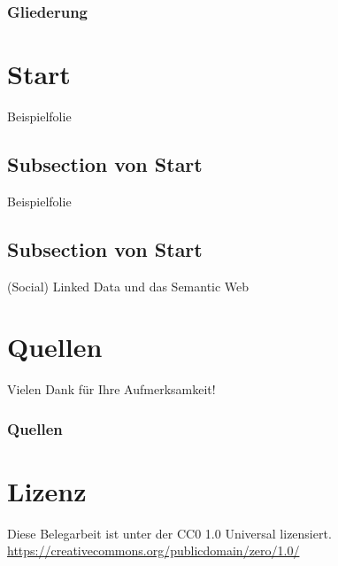 \documentclass{beamer}              %
\begin{document}
\begin{frame}	
	\frametitle{Gliederung}
	\tableofcontents
\end{frame}

\section{Start}
\begin{frame}{}
   \centering Beispielfolie
\end{frame}

\subsection{Subsection von Start}
\begin{frame}{}
   \centering Beispielfolie
\end{frame}

\subsection{Subsection von Start}
\begin{frame}{}
   \centering (Social) Linked Data und das Semantic Web
\end{frame}


\section{Quellen}
\begin{frame}{}
   \centering Vielen Dank für Ihre Aufmerksamkeit!
\end{frame}

\begin{frame}[allowframebreaks]
        \frametitle{Quellen}
        
        
\end{frame}

\section{Lizenz}
\begin{frame}{}
   \centering Diese Belegarbeit ist unter der CC0 1.0 Universal lizensiert. \url{https://creativecommons.org/publicdomain/zero/1.0/}
\end{frame}
\end{document}
